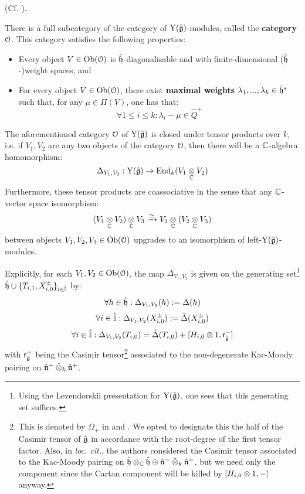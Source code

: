         \begin{lemma} \label{lemma: category_O_affine_yangian}
            (Cf. \cite[Theorem 4.9]{guay_nakajima_wendlandt_affine_yangian_coproduct}).
        
            There is a full subcategory of the category of $\mathrm{Y}(\hat{\mathfrak{g}})$-modules, called the \textbf{category $\mathcal{O}$}. This category satisfies the following properties:
            \begin{itemize}
                \item Every object $V \in \mathrm{Ob}(\mathcal{O})$ is $\hat{\mathfrak{h}}$-diagonalisable and with finite-dimensional ($\hat{\mathfrak{h}}$-)weight spaces, and
                \item For every object $V \in \mathrm{Ob}(\mathcal{O})$, there exist \textbf{maximal weights} $\lambda_1, ..., \lambda_k \in \hat{\mathfrak{h}}^*$ such that, for any $\mu \in \Pi(V)$, one has that:
                    $$\forall 1 \leq i \leq k: \lambda_i - \mu \in \hat{Q}^+$$
            \end{itemize}

            The aforementioned category $\mathcal{O}$ of $\mathrm{Y}(\hat{\mathfrak{g}})$ is closed under tensor products over $k$, i.e. if $V_1, V_2$ are any two objects of the category $\mathcal{O}$, then there will be a $\mathbb{C}$-algebra homomorphism:
                $$\Delta_{V_1, V_2}: \rmY(\hat{\g}) \to \End_k(V_1 \tensor_{\bbC} V_2)$$
            Furthermore, these tensor products are coassociative in the sense that any $\mathbb{C}$-vector space isomorphism:
                $$(V_1 \tensor_{\bbC} V_2) \tensor_{\bbC} V_3 \xrightarrow[]{\cong} V_1 \tensor_{\bbC} (V_2 \tensor_{\bbC} V_3)$$
            between objects $V_1, V_2, V_3 \in \mathrm{Ob}(\mathcal{O})$ upgrades to an isomorphism of left-$\mathrm{Y}(\hat{\mathfrak{g}})$-modules.

            Explicitly, for each $V_1, V_2 \in \mathrm{Ob}(\mathcal{O})$, the map $\Delta_{V_1, V_2}$ is given on the generating set\footnote{Using the Levendorskii presentation for $\mathrm{Y}(\hat{\mathfrak{g}})$, one sees that this generating set suffices.} $\hat{\mathfrak{h}} \cup \{T_{i, 1}, X_{i, 0}^{\pm}\}_{i \in \hat{\mathbb{I}}}$ by:
                $$\forall h \in \hat{\mathfrak{h}}: \Delta_{V_1, V_2}(h) := \bar{\Delta}(h)$$
                $$\forall i \in \hat{\mathbb{I}}: \Delta_{V_1, V_2}(X_{i, 0}^{\pm}) := \bar{\Delta}(X_{i, 0}^{\pm})$$
                $$\forall i \in \hat{\simpleroots}: \Delta_{V_1, V_2}(T_{i, 0}) = \bar{\Delta}(T_{i, 0}) + [H_{i, 0} \tensor 1, \sfr_{ \hat{\g} }^-]$$
            with $\mathsf{r}_{ \hat{\mathfrak{g}} }^-$ being the Casimir tensor\footnote{This is denoted by $\Omega_+$ in \cite{guay_nakajima_wendlandt_affine_yangian_coproduct} and \cite{guay_nakajima_wendlandt_affine_yangian_vertex_representations_and_PBW}. We opted to designate this the  half of the Casimir tensor of $\hat{\mathfrak{g}}$ in accordance with the root-degree of the first tensor factor. Also, in \textit{loc. cit.}, the authors considered the Casimir tensor associated to the Kac-Moody pairing on $\hat{\h} \tensor_{\bbC} \hat{\h} \oplus \hat{\n}^- \hattensor_k \hat{\n}^+$, but we need only the  component since the Cartan component will be killed by $[H_{i, 0} \tensor 1, -]$ anyway.} associated to the non-degenerate Kac-Moody pairing on $\hat{\n}^- \hattensor_k \hat{\n}^+$.
        \end{lemma}
